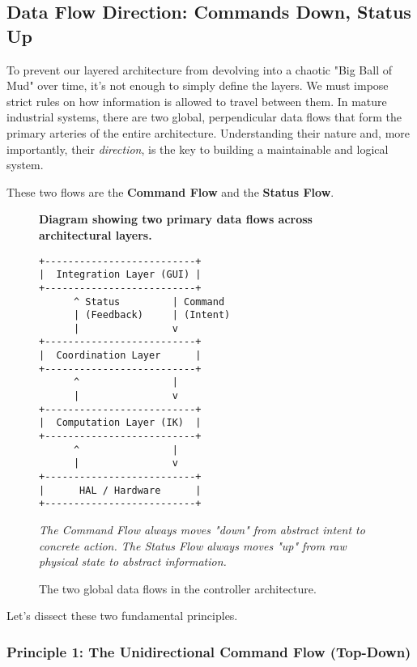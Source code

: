 \subsection{Data Flow Direction: Commands Down, Status Up}
\label{subsec:data_flow_direction}

To prevent our layered architecture from devolving into a chaotic "Big Ball of Mud" over time, it's not enough to simply define the layers. We must impose strict rules on how information is allowed to travel between them. In mature industrial systems, there are two global, perpendicular data flows that form the primary arteries of the entire architecture. Understanding their nature and, more importantly, their \textit{direction}, is the key to building a maintainable and logical system.

These two flows are the \textbf{Command Flow} and the \textbf{Status Flow}.

\begin{figure}[h!]
    \centering
    \begin{tcolorbox}[width=\textwidth, halign=center, title=The Two Great Data Flows of a Controller Architecture]
        \vspace{0.5cm}
        \textbf{Diagram showing two primary data flows across architectural layers.}

        \begin{verbatim}
+--------------------------+
|  Integration Layer (GUI) |
+--------------------------+
      ^ Status         | Command
      | (Feedback)     | (Intent)
      |                v
+--------------------------+
|  Coordination Layer      |
+--------------------------+
      ^                |
      |                v
+--------------------------+
|  Computation Layer (IK)  |
+--------------------------+
      ^                |
      |                v
+--------------------------+
|      HAL / Hardware      |
+--------------------------+
        \end{verbatim}
        \textit{The Command Flow always moves "down" from abstract intent to concrete action. The Status Flow always moves "up" from raw physical state to abstract information.}
    \end{tcolorbox}
    \caption{The two global data flows in the controller architecture.}
    \label{fig:global_data_flows}
\end{figure}

Let's dissect these two fundamental principles.

\subsubsection{Principle 1: The Unidirectional Command Flow (Top-Down)}
\label{subsubsec:command_flow}

